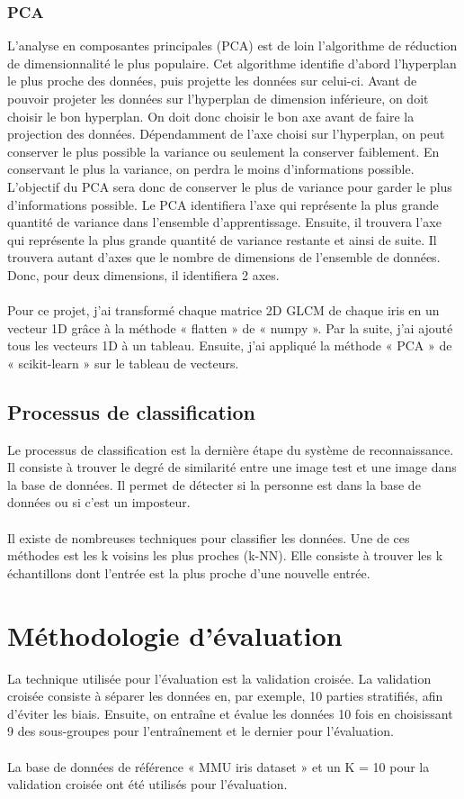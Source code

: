 \documentclass[12pt,twoside,letterpaper]{article}
\begin{document}
\subsubsection{PCA}
L'analyse en composantes principales (PCA) est de loin l'algorithme de réduction de dimensionnalité le plus populaire. Cet algorithme identifie d'abord l'hyperplan le plus proche des données, puis projette les données sur celui-ci. Avant de pouvoir projeter les données sur l’hyperplan de dimension inférieure, on doit choisir le bon hyperplan. On doit donc choisir le bon axe avant de faire la projection des données. Dépendamment de l’axe choisi sur l’hyperplan, on peut conserver le plus possible la variance ou seulement la conserver faiblement. En conservant le plus la variance, on perdra le moins d’informations possible. L’objectif du PCA sera donc de conserver le plus de variance pour garder le plus d’informations possible. Le PCA identifiera l’axe qui représente la plus grande quantité de variance dans l'ensemble d'apprentissage. Ensuite, il trouvera l’axe qui représente la plus grande quantité de variance restante et ainsi de suite. Il trouvera autant d’axes que le nombre de dimensions de l’ensemble de données. Donc, pour deux dimensions, il identifiera 2 axes.
\cite{ref_03}
\\~\\
Pour ce projet, j'ai transformé chaque matrice 2D GLCM de chaque iris en un vecteur 1D grâce à la méthode « flatten » de « numpy ». Par la suite, j'ai ajouté tous les vecteurs 1D à un tableau.  Ensuite, j'ai appliqué la méthode « PCA » de « scikit-learn » sur le tableau de vecteurs.

\subsection{Processus de classification}
Le processus de classification est la dernière étape du système de reconnaissance. Il consiste à trouver le degré de similarité entre une image test et une image dans la base de données. Il permet de détecter si la personne est dans la base de données ou si c’est un imposteur.\cite{ref_01}\cite{ref_06}
\\~\\
Il existe de nombreuses techniques pour classifier les données. Une de ces méthodes est les k voisins les plus proches (k-NN). Elle consiste à trouver les k échantillons dont l'entrée est la plus proche d'une nouvelle entrée.

\section{Méthodologie d’évaluation}
La technique utilisée pour l'évaluation est la validation croisée. La validation croisée consiste à séparer les données en, par exemple, 10 parties stratifiés, afin d’éviter les biais. Ensuite, on entraîne et évalue les données 10 fois en choisissant 9 des sous-groupes pour l'entraînement et le dernier pour l'évaluation.\cite{ref_03}
\ \\~\\
La base de données de référence « MMU iris dataset » et un K = 10 pour la validation croisée ont été utilisés pour l'évaluation.
\end{document}
